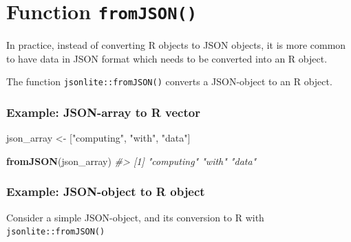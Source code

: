 \documentclass[
]{book}
\newenvironment{Shaded}{\begin{snugshade}}{\end{snugshade}}
\newcommand{\CommentTok}[1]{\textcolor[rgb]{0.56,0.35,0.01}{\textit{#1}}}
\newcommand{\FunctionTok}[1]{\textcolor[rgb]{0.13,0.29,0.53}{\textbf{#1}}}
\newcommand{\NormalTok}[1]{#1}
\newcommand{\OtherTok}[1]{\textcolor[rgb]{0.56,0.35,0.01}{#1}}
\newcommand{\StringTok}[1]{\textcolor[rgb]{0.31,0.60,0.02}{#1}}
\begin{document}
\hypertarget{function-fromjson}{%
\section{\texorpdfstring{Function \texttt{fromJSON()}}{Function fromJSON()}}\label{function-fromjson}}

In practice, instead of converting R objects to JSON objects, it is more
common to have data in JSON format which needs to be converted into an R object.

The function \texttt{jsonlite::fromJSON()} converts a JSON-object to an R object.

\hypertarget{example-json-array-to-r-vector}{%
\subsubsection*{Example: JSON-array to R vector}\label{example-json-array-to-r-vector}}

\begin{Shaded}
\begin{Highlighting}[]
\NormalTok{json\_array }\OtherTok{\textless{}{-}} \StringTok{\textquotesingle{}["computing", "with", "data"]\textquotesingle{}}

\FunctionTok{fromJSON}\NormalTok{(json\_array)}
\CommentTok{\#\textgreater{} [1] "computing" "with"      "data"}
\end{Highlighting}
\end{Shaded}

\hypertarget{example-json-object-to-r-object}{%
\subsubsection*{Example: JSON-object to R object}\label{example-json-object-to-r-object}}

Consider a simple JSON-object, and its conversion to R with
\texttt{jsonlite::fromJSON()}

\begin{Shaded}
\end{Shaded}
\end{document}
